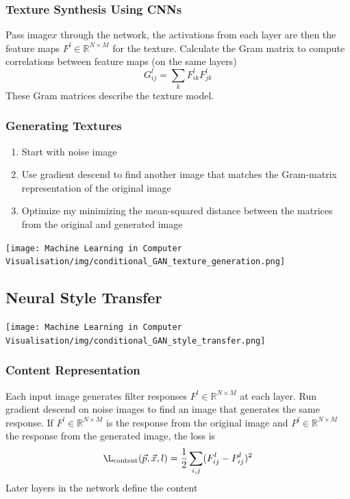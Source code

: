 \documentclass[x11names,11pt,a4paper]{article}
\theoremstyle{definition}
\newcommand*\R{\mathbb{R}}
\begin{document}
\subsubsection{Texture Synthesis Using CNNs}
Pass image$x$ through the network, the activations from each layer are then the feature maps $F^l \in \R^{N\times M}$ for the texture. Calculate the Gram matrix to compute correlations between feature maps (on the same layers)
\begin{equation*}
	G_{ij}^l = \sum_{k} F_{ik}^l F_{jk}^l
\end{equation*}
These Gram matrices describe the texture model.

\subsubsection{Generating Textures}
\begin{enumerate}[itemsep=0em]
	\item Start with noise image
	\item Use gradient descend to find another image that matches the Gram-matrix representation of the original image
	\item Optimize my minimizing the mean-squared distance between the matrices from the original and generated image
\end{enumerate}

\begin{center}
	\texttt{[image: Machine Learning in Computer Visualisation/img/conditional\_GAN\_texture\_generation.png]}
\end{center}

\subsection{Neural Style Transfer}
\begin{center}
	\texttt{[image: Machine Learning in Computer Visualisation/img/conditional\_GAN\_style\_transfer.png]}
\end{center}

\subsubsection{Content Representation}
Each input image generates filter responses $F^l \in \R^{N\times M}$ at each layer. Run gradient descend on noise images to find an image that generates the same response. If $F^l \in \R^{N\times M}$ is the response from the original image and $P^l \in \R^{N\times M}$ the response from the generated image, the loss is
\begin{equation*}
	\L_{\text{content}}(\vec{p},\vec{x},l) = \frac{1}{2} \sum_{i,j} (F_{ij}^l - P_{ij}^l)^2
\end{equation*}
Later layers in the network define the content
\end{document}
